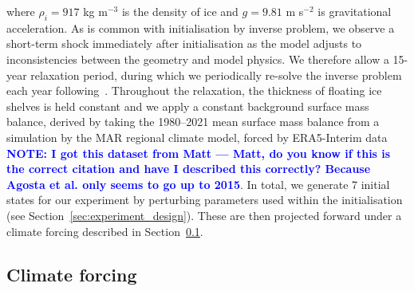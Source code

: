 \documentclass[journal abbreviation, manuscript]{copernicus}
\newcommand\note[1]{\textbf{\textcolor{blue}{NOTE: #1}}}   %
\begin{document}
\noindent where $\rho_i = 917$ kg m$^{-3}$ is the density of ice and $g = 9.81$ m s$^{-2}$ is gravitational acceleration. As is common with initialisation by inverse problem, we observe a short-term shock immediately after initialisation as the model adjusts to inconsistencies between the geometry and model physics. We therefore allow a 15-year relaxation period, during which we periodically re-solve the inverse problem each year following~\cite{bevanAmundsenSeaEmbayment2023}. Throughout the relaxation, the thickness of floating ice shelves is held constant and we apply a constant background surface mass balance, derived by taking the 1980--2021 mean surface mass balance from a simulation by the MAR regional climate model, forced by ERA5-Interim data \citep{agostaEstimationAntarcticSurface2019} \note{I got this dataset from Matt --- Matt, do you know if this is the correct citation and have I described this correctly? Because Agosta et al. only seems to go up to 2015}. In total, we generate 7 initial states for our experiment by perturbing parameters used within the initialisation (see Section~\ref{sec:experiment_design}). These are then projected forward under a climate forcing described in Section~\ref{sec:forcing}.

\subsection{Climate forcing}\label{sec:forcing}
\end{document}
